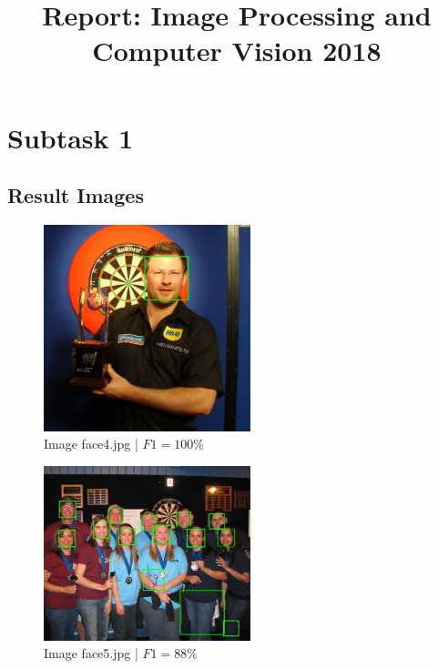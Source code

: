 \documentclass[conference]{IEEEtran}
\begin{document}
\begin{titlepage}
	\title{Report: Image Processing and Computer Vision 2018}
  	\author{
			\and
			}
			\maketitle
\end{titlepage}
\newpage

\section{Subtask 1}

\subsection{Result Images}


\begin{figure}[ht!]
\centering
\includegraphics[width=60mm]{img/Viola_Jones_Faces/face_detection4.jpg}
\caption{Image face4.jpg | $F1 = 100\%$ \label{img_face_4}}
\end{figure}

\begin{figure}[ht!]
\centering
\includegraphics[width=60mm]{img/Viola_Jones_Faces/face_detection5.jpg}
\caption{Image face5.jpg | $F1 = 88\%$ \label{img_face_5}}
\end{figure}
\end{document}
